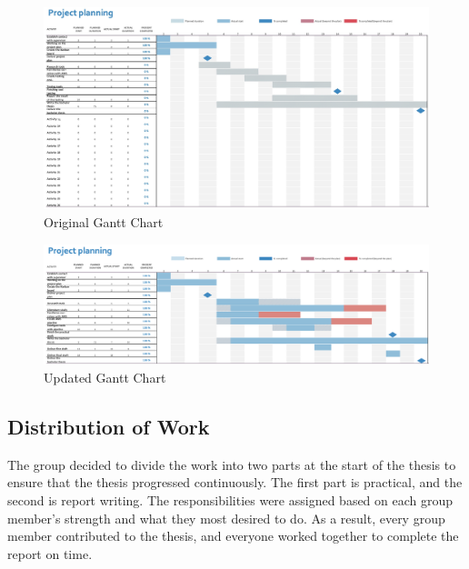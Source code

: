 \vspace{2mm}
\begin{figure}[H]
    \centering
    \includegraphics[width=1\columnwidth]{Images/gantt2.jpg}
    \caption{Original Gantt Chart}
    \label{fig: Original Gantt Chart}
\end{figure}

\vspace{2mm}
\begin{figure}[H]
    \centering
    \includegraphics[width=1\columnwidth]{Images/finished-gantt.png}
    \caption{Updated Gantt Chart}
    \label{fig: Updated Gantt Chart}
\end{figure}

\newpage
\subsection{Distribution of Work}
The group decided to divide the work into two parts at the start of the thesis to ensure that the thesis progressed continuously. The first part is practical, and the second is report writing. The responsibilities were assigned based on each group member's strength and what they most desired to do. As a result, every group member contributed to the thesis, and everyone worked together to complete the report on time. 

